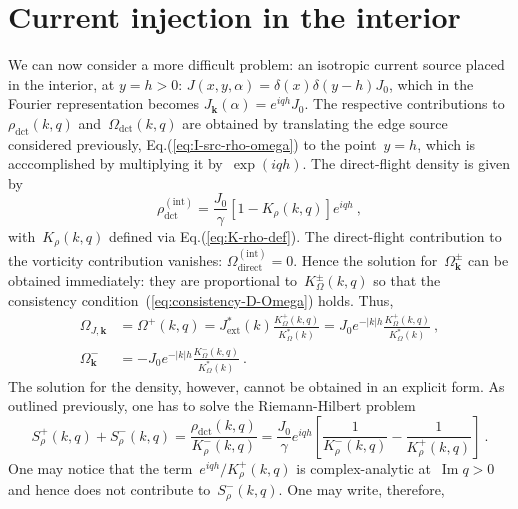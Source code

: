 \documentclass[preprint,aps,eqsecnum, prb]{revtex4-1}
\newcommand{\fplus}[1]{{#1}^{+}}
\newcommand{\fminus}[1]{{#1}^{-}}
\newcommand{\fplusminus}[1]{{#1}^{\pm}}
\renewcommand{\Im}{\mathop{\mathrm{Im}}\nolimits}
\newcommand{\dct}[1]{{#1}_\mathrm{dct}}
\begin{document}
\section{Current injection in the interior}
\label{sec:bulk-src}
We can now  consider a more difficult problem: 
an isotropic current source placed in the interior, at $y = h > 0$:
$J(x, y, \alpha) = \delta(x) \delta(y - h) J_0 $,
which in the Fourier representation becomes
$J_{\bm k}(\alpha) = e^{i q h} J_0$.
The respective contributions to~$\dct{\rho}(k, q)$ 
and~$\dct{\Omega}(k, q)$ are obtained by translating
the edge source considered previously, Eq.(\ref{eq:I-src-rho-omega}) 
to the point~$y = h$, which
is acccomplished by multiplying it by~$\exp(i q h)$.  The direct-flight
density is given by 
\begin{equation}
  \label{eq:source-bulk-rho}
  \dct{\rho}^\mathrm{(int)}
  = \frac{J_0}{\gamma} \left[1 - K_\rho(k, q) \right]e^{i q h}
  \ ,
\end{equation}
with~$K_\rho(k, q)$ defined via Eq.(\ref{eq:K-rho-def}). 
The direct-flight contribution to the vorticity contribution vanishes:
$\Omega_\mathrm{direct}^\mathrm{(int)} = 0$. Hence the solution
for~$\fplusminus{\Omega}_{\bm k}$ can be obtained immediately: 
they are proportional to~$\fplusminus{K}_\Omega(k, q)$
so that the consistency condition~(\ref{eq:consistency-D-Omega}) holds. 
Thus, 
\begin{align}
\label{eq:omega-J}
\Omega_{J, {\bm k}} &=  \fplus{\Omega}(k, q)
= J_\mathrm{ext}^\ast(k) \frac{\fplus{K}_\Omega(k, q)}{K_\Omega^\ast(k)}
= J_0 e^{-|k|h} \frac{\fplus{K}_\Omega(k, q)}{K_\Omega^\ast(k)}
\ ,
\\
\fminus{\Omega}_{\bm k}
&= - J_0 e^{-|k|h} \frac{\fminus{K}_\Omega(k, q)}{K_\Omega^\ast(k)}
\ .
\end{align}
The solution for the density, however, cannot be obtained in an explicit form.
As outlined previously, one has to solve the Riemann-Hilbert problem
\begin{equation}
  \label{eq:RH-rho}
  \fplus{S}_\rho(k, q) + \fminus{S}_\rho(k, q) =  
  \frac{\dct{\rho}(k, q)}{\fminus{K}_\rho(k, q)}  = 
  \frac{J_0}{\gamma} e^{iqh}
  \left[\frac{1}{\fminus{K}_\rho(k, q)} -
  \frac{1}{\fplus{K}_\rho(k, q)} \right]
  \ .
\end{equation}
One may notice that the term~$e^{iqh} / \fplus{K}_\rho(k, q)$
is complex-analytic at~$\Im q > 0$ and hence does not contribute
to~$\fminus{S}_\rho(k, q)$. One may write, therefore, 
\end{document}
